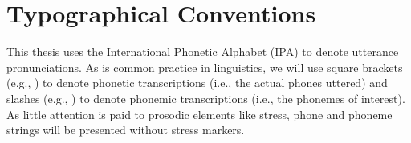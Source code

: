 \renewcommand\contentsname{Table of Contents}
\tableofcontents
\cleardoublepage
{}

\listoftables
\cleardoublepage
{}

\listoffigures
\cleardoublepage
{}

\chapter*{Typographical Conventions}
\label{typography}

This thesis uses the International Phonetic Alphabet (IPA)
to denote utterance pronunciations.
As is common practice in linguistics,
we will use square brackets (e.g., \ipa{[$\cdot$]})
to denote phonetic transcriptions
(i.e., the actual phones uttered)
and slashes (e.g., \ipa{/$\cdot$/})
to denote phonemic transcriptions
(i.e., the phonemes of interest).
As little attention is paid to prosodic elements like stress,
phone and phoneme strings will be presented
without stress markers.

\cleardoublepage
{}


